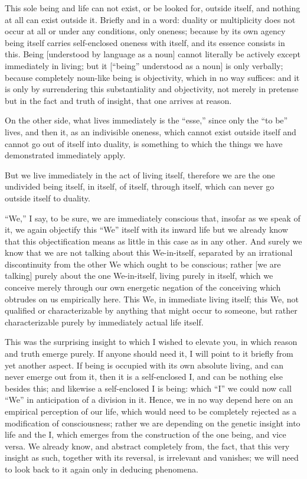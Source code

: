 This sole being and life can not exist,
or be looked for, outside itself,
and nothing at all can exist outside it.
Briefly and in a word:
duality or multiplicity does not occur at all
or under any conditions, only oneness;
because by its own agency
being itself carries self-enclosed oneness with itself,
and its essence consists in this.
Being [understood by language as a noun]
cannot literally be actively
except immediately in living;
but it [“being” understood as a noun] is only verbally;
because completely noun-like being is objectivity,
which in no way suffices:
and it is only by surrendering
this substantiality and objectivity,
not merely in pretense
but in the fact and truth of insight,
that one arrives at reason.

On the other side,
what lives immediately is the “esse,”
since only the “to be” lives,
and then it, as an indivisible oneness,
which cannot exist outside itself
and cannot go out of itself into duality,
is something to which the things
we have demonstrated immediately apply.

But we live immediately in the act of living itself,
therefore we are the one undivided being itself,
in itself, of itself, through itself,
which can never go outside itself to duality.

“We,” I say, to be sure, we are immediately conscious that,
insofar as we speak of it, we again objectify
this “We” itself with its inward life
but we already know that this objectification means
as little in this case as in any other.
And surely we know that we are not talking about this We-in-itself,
separated by an irrational discontinuity from the other We
which ought to be conscious;
rather [we are talking] purely
about the one We-in-itself,
living purely in itself,
which we conceive merely through
our own energetic negation of the conceiving
which obtrudes on us empirically here.
This We, in immediate living itself;
this We, not qualified or characterizable
by anything that might occur to someone,
but rather characterizable purely
by immediately actual life itself.

This was the surprising insight
to which I wished to elevate you,
in which reason and truth emerge purely.
If anyone should need it, I will point
to it briefly from yet another aspect.
If being is occupied with its own absolute living,
and can never emerge out from it,
then it is a self-enclosed I,
and can be nothing else besides this;
and likewise a self-enclosed I is being:
which “I” we could now call “We”
in anticipation of a division in it.
Hence, we in no way depend here on
an empirical perception of our life,
which would need to be completely rejected
as a modification of consciousness;
rather we are depending on the genetic insight into life and the I,
which emerges from the construction of the one being, and vice versa.
We already know, and abstract completely from, the fact,
that this very insight as such, together with its reversal,
is irrelevant and vanishes;
we will need to look back to it again only in deducing phenomena.

